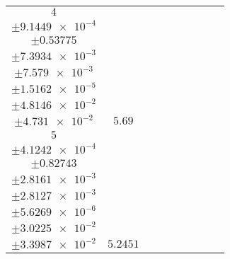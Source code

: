 \documentclass[8pt]{article}
\begin{document}
\begin{longtable}[l]{c c c c c c c c c}
$\num{4}$ & \begin{tabular}[c]{@{}c@{}}$\num{4.575e-2}$ \\ $\pm\num{9.1449e-4}$\end{tabular} & \begin{tabular}[c]{@{}c@{}}$\num{3.2834e-3}$ \\ $\pm\num{0.53775}$\end{tabular} & \begin{tabular}[c]{@{}c@{}}$\num{-2.9273e-2}$ \\ $\pm\num{7.3934e-3}$\end{tabular} & \begin{tabular}[c]{@{}c@{}}$\num{2.9566e+3}$ \\ $\pm\num{7.579e-3}$\end{tabular} & \begin{tabular}[c]{@{}c@{}}$\num{5.9148}$ \\ $\pm\num{1.5162e-5}$\end{tabular} & \begin{tabular}[c]{@{}c@{}}$\num{5.0533}$ \\ $\pm\num{4.8146e-2}$\end{tabular} & \begin{tabular}[c]{@{}c@{}}$\num{4.3552}$ \\ $\pm\num{4.731e-2}$\end{tabular} & $\num{5.69}$\\
$\num{5}$ & \begin{tabular}[c]{@{}c@{}}$\num{3.8582e-2}$ \\ $\pm\num{4.1242e-4}$\end{tabular} & \begin{tabular}[c]{@{}c@{}}$\num{-6.0209}$ \\ $\pm\num{0.82743}$\end{tabular} & \begin{tabular}[c]{@{}c@{}}$\num{0.93883}$ \\ $\pm\num{2.8161e-3}$\end{tabular} & \begin{tabular}[c]{@{}c@{}}$\num{2.9578e+3}$ \\ $\pm\num{2.8127e-3}$\end{tabular} & \begin{tabular}[c]{@{}c@{}}$\num{5.9171}$ \\ $\pm\num{5.6269e-6}$\end{tabular} & \begin{tabular}[c]{@{}c@{}}$\num{3.5842}$ \\ $\pm\num{3.0225e-2}$\end{tabular} & \begin{tabular}[c]{@{}c@{}}$\num{3.3479}$ \\ $\pm\num{3.3987e-2}$\end{tabular} & $\num{5.2451}$\\

\end{longtable}
\end{document}
